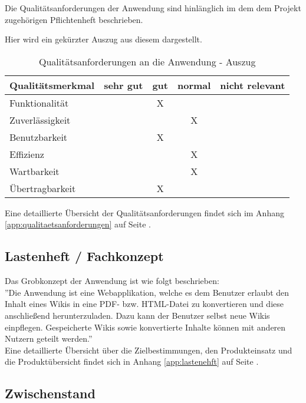 \documentclass[12pt, xcolor=dvipsnames]{scrartcl}
\begin{document}
Die Qualitätsanforderungen der Anwendung sind hinlänglich im dem dem Projekt zugehörigen Pflichtenheft beschrieben.

Hier wird ein gekürzter Auszug aus diesem dargestellt.

\begin{table}[H]
	\centering
	\begin{tabular}{lcccc}
	
	\rowcolor{white!15}
		\textbf{Qualitätsmerkmal} & \textbf{sehr gut} & \textbf{gut} & \textbf{normal} 
		& \textbf{nicht relevant}\\\hline
		

		Funktionalität 		&	& X	&	&	\\
		Zuverlässigkeit 	&	&	& X	&	\\
		Benutzbarkeit 		&	& X	&	&	\\
		Effizienz	 		&	&	& X	&	\\
		Wartbarkeit 		&	&	& X	&	\\
		Übertragbarkeit 	&	& X	&	&	\\
	\end{tabular}	
	
	\caption{Qualitätsanforderungen an die Anwendung - Auszug}
	\label{tab:qualitätsanforderungen}
\end{table}

Eine detaillierte Übersicht der Qualitätsanforderungen findet sich im Anhang \ref{app:qualitaetsanforderungen} auf Seite \pageref{app:qualitaetsanforderungen}.


\subsection{Lastenheft / Fachkonzept}

Das Grobkonzept der Anwendung ist wie folgt beschrieben: \\

''Die Anwendung ist eine Webapplikation, welche es dem Benutzer erlaubt den Inhalt eines 
Wikis in eine PDF- bzw. HTML-Datei zu konvertieren und diese anschließend herunterzuladen.
Dazu kann der Benutzer selbst neue Wikis einpflegen. Gespeicherte Wikis sowie konvertierte Inhalte können mit anderen Nutzern geteilt werden.'' \\

Eine detaillierte Übersicht über die Zielbestimmungen, den Produkteinsatz und die Produktübersicht findet sich in Anhang \ref{app:lastenehft} auf Seite \pageref{app:lastenehft}.


\subsection{Zwischenstand}
\end{document}
